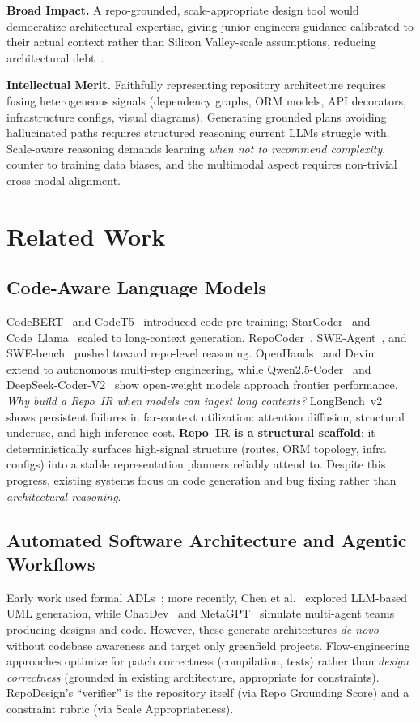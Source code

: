 \documentclass{article}
\begin{document}
\textbf{Broad Impact.} A repo-grounded, scale-appropriate design tool would democratize architectural expertise, giving junior engineers guidance calibrated to their actual context rather than Silicon Valley-scale assumptions, reducing architectural debt~\cite{besker}.

\textbf{Intellectual Merit.} Faithfully representing repository architecture requires fusing heterogeneous signals (dependency graphs, ORM models, API decorators, infrastructure configs, visual diagrams). Generating grounded plans avoiding hallucinated paths requires structured reasoning current LLMs struggle with. Scale-aware reasoning demands learning \emph{when not to recommend complexity}, counter to training data biases, and the multimodal aspect requires non-trivial cross-modal alignment.

\section{Related Work}

\subsection{Code-Aware Language Models}
CodeBERT~\cite{feng} and CodeT5~\cite{codet5} introduced code pre-training; StarCoder~\cite{starcoder} and Code~Llama~\cite{codellama} scaled to long-context generation. RepoCoder~\cite{repocoder}, SWE-Agent~\cite{sweagent}, and SWE-bench~\cite{swebench} pushed toward repo-level reasoning. OpenHands~\cite{openhands} and Devin~\cite{devin} extend to autonomous multi-step engineering, while Qwen2.5-Coder~\cite{qwencoder} and DeepSeek-Coder-V2~\cite{deepseek} show open-weight models approach frontier performance. \emph{Why build a Repo~IR when models can ingest long contexts?} LongBench~v2 shows persistent failures in far-context utilization: attention diffusion, structural underuse, and high inference cost. \textbf{Repo~IR is a structural scaffold}: it deterministically surfaces high-signal structure (routes, ORM topology, infra configs) into a stable representation planners reliably attend to. Despite this progress, existing systems focus on code generation and bug fixing rather than \emph{architectural reasoning}.

\subsection{Automated Software Architecture and Agentic Workflows}
Early work used formal ADLs~\cite{medvidovic}; more recently, Chen et al.~\cite{chen} explored LLM-based UML generation, while ChatDev~\cite{chatdev} and MetaGPT~\cite{metagpt} simulate multi-agent teams producing designs and code. However, these generate architectures \emph{de novo} without codebase awareness and target only greenfield projects. Flow-engineering approaches optimize for patch correctness (compilation, tests) rather than \emph{design correctness} (grounded in existing architecture, appropriate for constraints). RepoDesign's ``verifier'' is the repository itself (via Repo Grounding Score) and a constraint rubric (via Scale Appropriateness).
\end{document}
